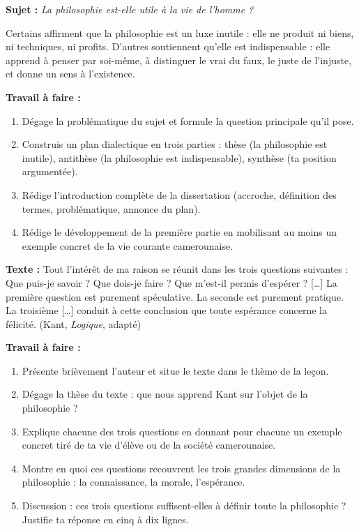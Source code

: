 \documentclass[11pt]{article}
\newcounter{popsec}
\newcounter{popsub}
\newcommand{\courssub}[1]{%
  \stepcounter{popsub}%
  \par\vspace{9pt}\noindent{\popxbold\fontsize{11.5}{13}\selectfont\color{popink}{\color{poporange}\thepopsec.\thepopsub}\hspace{6pt}#1}\par\nopagebreak\vspace{4pt}
}
\begin{document}
\courssub{Je me prépare au Bac}

\begin{exercice}
\textbf{Sujet :} \emph{La philosophie est-elle utile à la vie de l'homme ?}

Certains affirment que la philosophie est un luxe inutile : elle ne produit ni biens, ni techniques, ni profits. D'autres soutiennent qu'elle est indispensable : elle apprend à penser par soi-même, à distinguer le vrai du faux, le juste de l'injuste, et donne un sens à l'existence.

\textbf{Travail à faire :}
\begin{enumerate}
\item Dégage la problématique du sujet et formule la question principale qu'il pose.
\item Construis un plan dialectique en trois parties : thèse (la philosophie est inutile), antithèse (la philosophie est indispensable), synthèse (ta position argumentée).
\item Rédige l'introduction complète de la dissertation (accroche, définition des termes, problématique, annonce du plan).
\item Rédige le développement de la première partie en mobilisant au moins un exemple concret de la vie courante camerounaise.
\end{enumerate}
\end{exercice}

\begin{exercice}
\textbf{Texte :} \og Tout l'intérêt de ma raison se réunit dans les trois questions suivantes : Que puis-je savoir ? Que dois-je faire ? Que m'est-il permis d'espérer ? [\ldots] La première question est purement spéculative. La seconde est purement pratique. La troisième [\ldots] conduit à cette conclusion que toute espérance concerne la félicité. \fg{} (Kant, \emph{Logique}, adapté)

\textbf{Travail à faire :}
\begin{enumerate}
\item Présente brièvement l'auteur et situe le texte dans le thème de la leçon.
\item Dégage la thèse du texte : que nous apprend Kant sur l'objet de la philosophie ?
\item Explique chacune des trois questions en donnant pour chacune un exemple concret tiré de ta vie d'élève ou de la société camerounaise.
\item Montre en quoi ces questions recouvrent les trois grandes dimensions de la philosophie : la connaissance, la morale, l'espérance.
\item Discussion : ces trois questions suffisent-elles à définir toute la philosophie ? Justifie ta réponse en cinq à dix lignes.
\end{enumerate}
\end{exercice}
\end{document}
